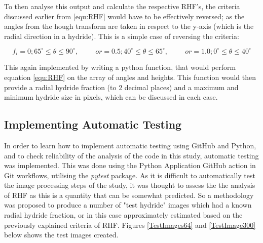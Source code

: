 \documentclass{article}
\begin{document}
    \noindent To then analyse this output and calculate the respective RHF's, the criteria discussed earlier from \ref{equ:RHF} would have to be effectively reversed; as the angles from the hough transform are taken in respect to the y-axis (which is the radial direction in a hydride). This is a simple case of reversing the criteria:
    
    \begin{equation}
        f_i = 0; 65^{\circ} \leq \theta \leq 90^{\circ},\hspace{1cm} or = 0.5;  40^{\circ} \leq \theta \leq 65^{\circ}, \hspace{1cm} or = 1.0; 0^{\circ} \leq \theta \leq 40^{\circ}
    \end{equation}
    
    \noindent This again implemented by writing a python function, that would perform equation \ref{equ:RHF} on the array of angles and heights. This function would then provide a radial hydride fraction (to 2 decimal places) and a maximum and minimum hydride size in pixels, which can be discussed in each case.
    
\subsection{Implementing Automatic Testing}
    In order to learn how to implement automatic testing using GitHub and Python, and to check reliability of the analysis of the code in this study, automatic testing was implemented. This was done using the Python Application GitHub action in Git workflows, utilising the \textit{pytest} package. As it is difficult to automatically test the image processing steps of the study, it was thought to assess the the analysis of RHF as this is a quantity that can be somewhat predicted. So a methodology was proposed to produce a number of "test hydride" images which had a known radial hydride fraction, or in this case approximately estimated based on the previously explained criteria of RHF. Figures \ref{TestImages64} and \ref{TestImage300} below shows the test images created.
\end{document}
